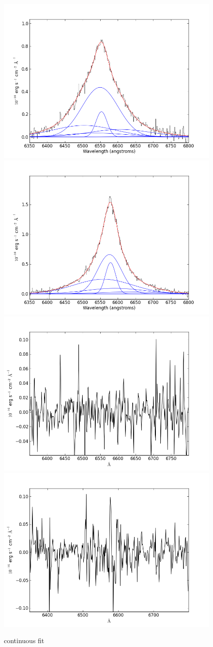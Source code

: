 \documentclass[usenatbib]{mn2e}
\begin{document}
\newpage

\begin{figure}
\begin{center}
\includegraphics[width=0.46\linewidth,angle=0]{Halpha_2.png}
\vspace{5mm}
\includegraphics[width=0.49\linewidth,angle=0]{Halpha_3.png}\\
\includegraphics[width=0.46\linewidth,angle=0]{Halpha_res_2.png}
\hspace{5mm}
\includegraphics[width=0.49\linewidth,angle=0]{Halpha_res_3.png}\\
\end{center} 
\caption{continuous fit \label{fig:landscape}}   
\end{figure}
\end{document}
